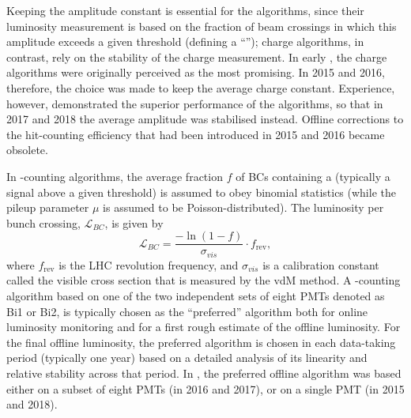 \documentclass[cernpreprint, atlasdraft=false, UKenglish,british,orcidlogo, texmf, orcidlogo]{atlasdoc}
\begin{document}
Keeping the amplitude constant is essential for the \HIT algorithms, since their luminosity measurement is based on the fraction of beam crossings in which this amplitude exceeds a given threshold (defining a ``\HIT''); charge algorithms, in contrast, rely on the stability of the charge measurement. In early \RunTwo, the charge algorithms were originally perceived as the most promising. In 2015 and 2016, therefore, the choice was made to keep the average charge constant. Experience, however, demonstrated the superior performance of the \HIT algorithms, so that in 2017 and 2018 the average amplitude was stabilised instead. Offline corrections to the hit-counting efficiency that had been introduced in 2015 and 2016 became obsolete.
 
In  \HIT-counting algorithms, the average fraction $f$ of \glspl{BC} containing a \HIT (typically a signal above a given threshold) is assumed to obey binomial statistics (while the pileup parameter $\mu$ is assumed to be Poisson-distributed). The luminosity per bunch crossing, $\mathcal{L}_{BC}$, is given by
\begin{equation}
\mathcal{L}_{BC}=\frac{-\ln(1-f)}{\sigma_{vis}}\cdot f_\text{rev},
\end{equation}
where $f_\text{rev}$ is the \gls{LHC} revolution frequency, and $\sigma_{vis}$ is a calibration constant called the visible cross section that is measured by the \gls{vdM} method. A \HIT-counting algorithm based on one of the two independent sets of eight \glspl{PMT} denoted as Bi1 or Bi2, is  typically chosen as the ``preferred'' algorithm both for online luminosity monitoring and for a first rough estimate of the offline luminosity. For the final offline luminosity, the preferred algorithm is chosen in each data-taking period (typically one year) based on a detailed analysis of its linearity and relative stability across that period. In \RunTwo, the preferred offline algorithm was based either on a subset of eight \glspl{PMT} (in 2016 and 2017), or on a single \gls{PMT} (in 2015 and 2018).
 
\end{document}
